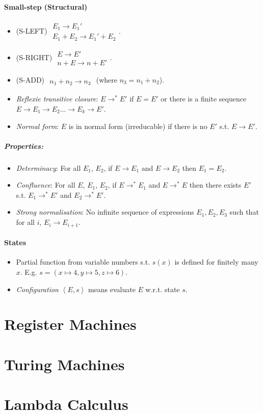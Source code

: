 \documentclass[twocolumn,english]{article}
\begin{document}
\paragraph{Small-step (Structural)}
\begin{itemize}
\item {\scriptsize{}(S-LEFT)} $\begin{array}{c}
E_{1}\rightarrow E_{1}'\\
\hline E_{1}+E_{2}\rightarrow E_{1}'+E_{2}
\end{array}$.
\item {\scriptsize{}(S-RIGHT)} $\begin{array}{c}
E\rightarrow E'\\
\hline n+E\rightarrow n+E'
\end{array}$.
\item {\scriptsize{}(S-ADD)} $\begin{array}{c}
\\
\hline n_{1}+n_{2}\rightarrow n_{3}
\end{array}$ (where $n_{3}=n_{1}+n_{2}$).
\item \emph{Reflexie transitive closure}: $E\rightarrow^{*}E'$ if $E=E'$
or there is a finite sequence $E\rightarrow E_{1}\rightarrow E_{2}\dots\rightarrow E_{k}\rightarrow E'$.
\item \emph{Normal form}: $E$ is in normal form (irreducable) if there
is no $E'$ s.t. $E\rightarrow E'$.
\end{itemize}

\subparagraph{Properties:}
\begin{itemize}
\item \emph{Determinacy}: For all $E_{1}$, $E_{2}$, if $E\rightarrow E_{1}$
and $E\rightarrow E_{2}$ then $E_{1}=E_{2}$.
\item \emph{Confluence}: For all $E$, $E_{1}$, $E_{2}$, if $E\rightarrow^{*}E_{1}$
and $E\rightarrow^{*}E$ then there exists $E'$ s.t. $E_{1}\rightarrow^{*}E'$
and $E_{2}\rightarrow^{*}E'$.
\item \emph{Strong normalisation}: No infinite sequence of expressions $E_{1},E_{2},E_{3}$
such that for all $i$, $E_{i}\rightarrow E_{i+1}$.
\end{itemize}

\paragraph{States}
\begin{itemize}
\item Partial function from variable numbers s.t. $s(x)$ is defined for
finitely many $x$. E.g. $s=\left(x\mapsto4,y\mapsto5,z\mapsto6\right)$.
\item \emph{Configuration} $\left\langle E,s\right\rangle $ means evaluate
$E$ w.r.t. state $s$.
\end{itemize}

\section{Register Machines}

\section{Turing Machines}

\section{Lambda Calculus}
\end{document}
